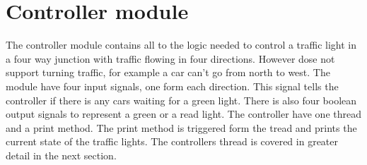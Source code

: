 \section{Controller module}
The controller module contains all to the logic needed to control a traffic light in a four way junction with traffic flowing in four directions. However dose not support turning traffic, for example a car can't go from north to west. The module have four input signals, one form each direction. This signal tells the controller if there is any cars waiting for a green light. There is also four boolean output signals to represent a green or a read light. The controller have one thread and a print method. The print method is triggered form the tread and prints the current state of the traffic lights. The controllers thread is covered in greater detail in the next section. 



\subsection{}

